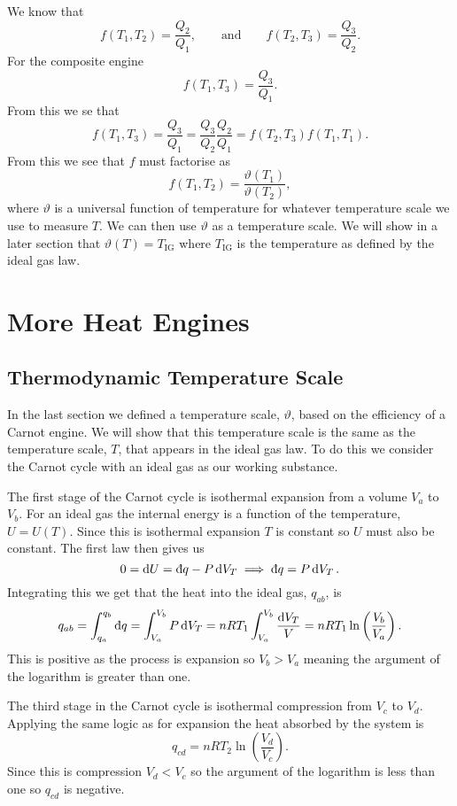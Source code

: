 \documentclass[a4paper]{article}
\newcommand{\ddbar}[1]{\text{\dj}{#1}}
\begin{document}
    We know that
    \[f(T_1, T_2) = \frac{Q_2}{Q_1},\qquad\text{and}\qquad f(T_2, T_3) = \frac{Q_3}{Q_2}.\]
    For the composite engine
    \[f(T_1, T_3) = \frac{Q_3}{Q_1}.\]
    From this we se that
    \[f(T_1, T_3) = \frac{Q_3}{Q_1} = \frac{Q_3}{Q_2}\frac{Q_2}{Q_1} = f(T_2, T_3)f(T_1, T_1).\]
    From this we see that \(f\) must factorise as
    \[f(T_1, T_2) = \frac{\vartheta(T_1)}{\vartheta(T_2)},\]
    where \(\vartheta\) is a universal function of temperature for whatever temperature scale we use to measure \(T\).
    We can then use \(\vartheta\) as a temperature scale.
    We will show in a later section that \(\vartheta(T) = T_\text{IG}\) where \(T_\text{IG}\) is the temperature as defined by the ideal gas law.
    
    \section{More Heat Engines}
    \subsection{Thermodynamic Temperature Scale}
    In the last section we defined a temperature scale, \(\vartheta\), based on the efficiency of a Carnot engine.
    We will show that this temperature scale is the same as the temperature scale, \(T\), that appears in the ideal gas law.
    To do this we consider the Carnot cycle with an ideal gas as our working substance.
    
    The first stage of the Carnot cycle is isothermal expansion from a volume \(V_a\) to \(V_b\).
    For an ideal gas the internal energy is a function of the temperature, \(U = U(T)\).
    Since this is isothermal expansion \(T\) is constant so \(U\) must also be constant.
    The first law then gives us
    \[0 = \dd{U} = \ddbar{q} - P\dd{V_T} \implies \ddbar{q} = P\dd{V_T}.\]
    Integrating this we get that the heat into the ideal gas, \(q_{ab}\), is
    \[q_{ab} = \int_{q_a}^{q_b} \ddbar{q} = \int_{V_a}^{V_b} P\dd{V_T} = nRT_1 \int_{V_a}^{V_b} \frac{\dd{V_T}}{V} = nRT_1 \ln\left(\frac{V_b}{V_a}\right).\]
    This is positive as the process is expansion so \(V_b > V_a\) meaning the argument of the logarithm is greater than one.
    
    The third stage in the Carnot cycle is isothermal compression from \(V_c\) to \(V_d\).
    Applying the same logic as for expansion the heat absorbed by the system is
    \[q_{cd} = nRT_2\ln\left(\frac{V_d}{V_c}\right).\]
    Since this is compression \(V_d < V_c\) so the argument of the logarithm is less than one so \(q_{cd}\) is negative.
    
\end{document}
